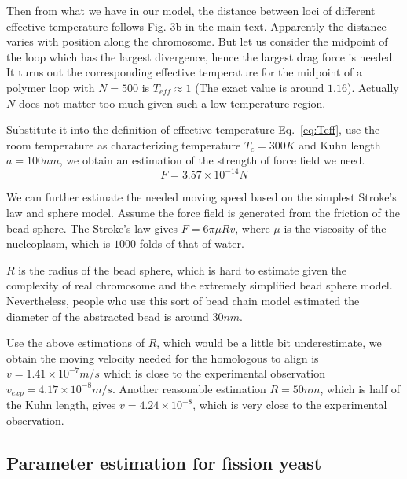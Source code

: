\documentclass{article}
\begin{document}
Then from what we have in our model, the distance between loci of different effective temperature follows Fig. 3b in the main text.
Apparently the distance varies with position along the chromosome. 
But let us consider the midpoint of the loop which has the largest divergence, hence the largest drag force is needed.
It turns out the corresponding effective temperature for the midpoint of a polymer loop with $N=500$ is $T_{eff}\approx 1$ (The exact value is around $1.16$). 
Actually $N$ does not matter too much given such a low temperature region. 

Substitute it into the definition of effective temperature Eq.~\ref{eq:Teff}, use the room temperature as characterizing temperature $T_c = 300K$ and Kuhn length $a = 100nm$, we obtain an estimation of the strength of force field we need.
\begin{equation}
	F = 3.57\times10^{-14} N
\end{equation}

We can further estimate the needed moving speed based on the simplest Stroke's law and sphere model. 
Assume the force field is generated from the friction of the bead sphere. 
The Stroke's law gives $F= 6\pi \mu R v$, where $\mu$ is the viscosity of the nucleoplasm, which is $1000$ folds of that of water.

$R$ is the radius of the bead sphere, which is hard to estimate given the complexity of real chromosome and the extremely simplified bead sphere model.
Nevertheless, people who use this sort of bead chain model estimated the diameter of the abstracted bead is around $30nm$\cite{Rosa2008}.

Use the above estimations of $R$, which would be a little bit underestimate, we obtain the moving velocity needed for the homologous to align is $v = 1.41\times10^{-7} m/s$ which is close to the experimental observation $v_{exp} = 4.17\times10^{-8}m/s$.
Another reasonable estimation $R=50nm$, which is half of the Kuhn length, gives $v = 4.24\times10^{-8}$, which is very close to the experimental observation.

\subsection{Parameter estimation for fission yeast}
\label{sub:estimation}
\end{document}
